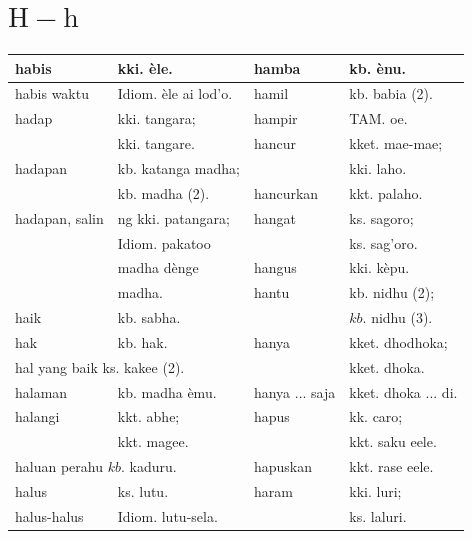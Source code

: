\documentclass[10pt]{article}
\begin{document}
\section*{\(\mathrm{H}-\mathrm{h}\)}
\begin{center}
\begin{tabular}{|l|l|l|l|}
\hline
habis & kki. èle. & hamba & kb. ènu. \\
\hline
habis waktu & Idiom. èle ai lod'o. & hamil & kb. babia (2). \\
\hline
hadap & kki. tangara; & hampir & TAM. oe. \\
\hline
 & kki. tangare. & hancur & kket. mae-mae; \\
\hline
hadapan & kb. katanga madha; &  & kki. laho. \\
\hline
 & kb. madha (2). & hancurkan & kkt. palaho. \\
\hline
hadapan, salin & ng kki. patangara; & hangat & ks. sagoro; \\
\hline
 & Idiom. pakatoo &  & ks. sag'oro. \\
\hline
 & madha dènge & hangus & kki. kèpu. \\
\hline
 & madha. & hantu & kb. nidhu (2); \\
\hline
haik & kb. sabha. &  & \(k b\). nidhu (3). \\
\hline
hak & kb. hak. & hanya & kket. dhodhoka; \\
\hline
\multicolumn{2}{|l|}{hal yang baik ks. kakee (2).} &  & kket. dhoka. \\
\hline
halaman & kb. madha èmu. & hanya ... saja & kket. dhoka ... di. \\
\hline
halangi & kkt. abhe; & hapus & kk. caro; \\
\hline
 & kkt. magee. &  & kkt. saku eele. \\
\hline
\multicolumn{2}{|l|}{haluan perahu \(k b\). kaduru.} & hapuskan & kkt. rase eele. \\
\hline
halus & ks. lutu. & haram & kki. luri; \\
\hline
halus-halus & Idiom. lutu-sela. &  & ks. laluri. \\
\hline
\end{tabular}
\end{center}
\end{document}
